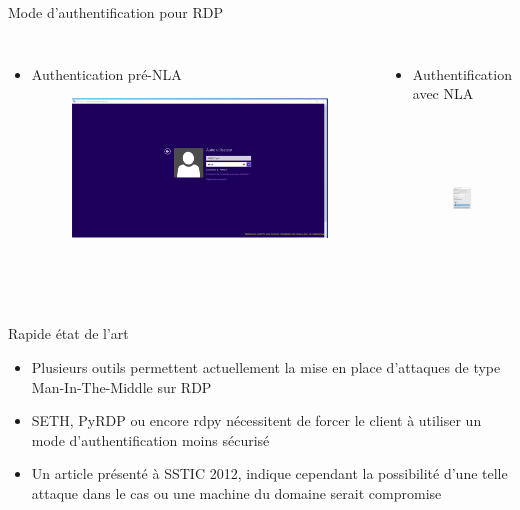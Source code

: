 \documentclass{beamer}
\begin{document}
\begin{frame}{Mode d'authentification  pour RDP}
	\begin{columns}[T]
		\begin{itemize}
		\item Authentication pré-NLA
		\begin{figure}
		\includegraphics[scale=0.10]{No_NLA.png}
	\end{figure}
		\end{itemize}
		\begin{itemize}
		\item  Authentification avec NLA
		\begin{figure}
		\includegraphics[width=100pt,height=120pt]{NLA.png}
		\end{figure}
		\end{itemize}
	\end{columns}
\end{frame}


\begin{frame}[fragile]{Rapide état de l'art}
	\begin{itemize}
	\item Plusieurs outils permettent actuellement la mise en place d'attaques de type Man-In-The-Middle sur RDP
	\item SETH, PyRDP ou encore rdpy nécessitent de forcer le client à utiliser un mode d'authentification moins sécurisé
	\item Un article présenté à SSTIC 2012\footnotemark, indique cependant la possibilité d'une telle attaque dans le cas ou une machine du domaine serait compromise
	\end{itemize}
\end{frame}
\end{document}
